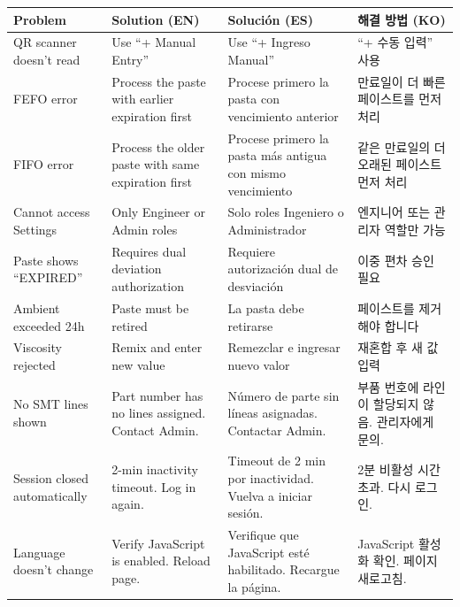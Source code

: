 \documentclass[12pt,a4paper]{article}
\begin{document}
\renewcommand{\arraystretch}{1.4}
\begin{longtable}{p{4.5cm}p{4cm}p{4cm}p{4cm}}
\toprule
\textbf{Problem} & \textbf{Solution (EN)} & \textbf{Solución (ES)} & \textbf{해결 방법 (KO)} \\
\midrule
\endhead

QR scanner doesn't read &
Use ``+ Manual Entry'' &
Use ``+ Ingreso Manual'' &
``+ 수동 입력'' 사용 \\

FEFO error &
Process the paste with earlier expiration first &
Procese primero la pasta con vencimiento anterior &
만료일이 더 빠른 페이스트를 먼저 처리 \\

FIFO error &
Process the older paste with same expiration first &
Procese primero la pasta más antigua con mismo vencimiento &
같은 만료일의 더 오래된 페이스트 먼저 처리 \\

Cannot access Settings &
Only Engineer or Admin roles &
Solo roles Ingeniero o Administrador &
엔지니어 또는 관리자 역할만 가능 \\

Paste shows ``EXPIRED'' &
Requires dual deviation authorization &
Requiere autorización dual de desviación &
이중 편차 승인 필요 \\

Ambient exceeded 24h &
Paste must be retired &
La pasta debe retirarse &
페이스트를 제거해야 합니다 \\

Viscosity rejected &
Remix and enter new value &
Remezclar e ingresar nuevo valor &
재혼합 후 새 값 입력 \\

No SMT lines shown &
Part number has no lines assigned. Contact Admin. &
Número de parte sin líneas asignadas. Contactar Admin. &
부품 번호에 라인이 할당되지 않음. 관리자에게 문의. \\

Session closed automatically &
2-min inactivity timeout. Log in again. &
Timeout de 2 min por inactividad. Vuelva a iniciar sesión. &
2분 비활성 시간 초과. 다시 로그인. \\

Language doesn't change &
Verify JavaScript is enabled. Reload page. &
Verifique que JavaScript esté habilitado. Recargue la página. &
JavaScript 활성화 확인. 페이지 새로고침. \\

\bottomrule
\end{longtable}
\end{document}
